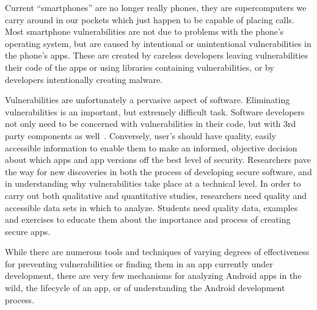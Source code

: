 



Current ``smartphones'' are no longer really phones, they are supercomputers we carry around in our pockets which just happen to be capable of placing calls. Most smartphone vulnerabilities are not due to problems with the phone's operating system, but are caused by intentional or unintentional vulnerabilities in the phone's apps. These are created by careless developers leaving vulnerabilities their code of the apps or using libraries containing vulnerabilities, or by developers intentionally creating malware.

Vulnerabilities are unfortunately a pervasive aspect of software. Eliminating vulnerabilities is an important, but extremely difficult task. Software developers not only need to be concerned with vulnerabilities in their code, but with 3rd party components as well~\cite{Sun:2014:NPA:2627393.2627396}.  Conversely, user's should have quality, easily accessible information to enable them to make an informed, objective decision about which apps and app versions off the best level of security. Researchers pave the way for new discoveries in both the process of developing secure software, and in understanding why vulnerabilities take place at a technical level. In order to carry out both qualitative and quantitative studies, researchers need quality and accessible data sets in which to analyze. Students need quality data, examples and exercises to educate them about the importance and process of creating secure apps.

While there are numerous tools and techniques of varying degrees of effectiveness for preventing vulnerabilities or finding them in an app currently under development, there are very few mechanisms for analyzing Android apps in the wild, the lifecycle of an app, or of understanding the Android development process.









